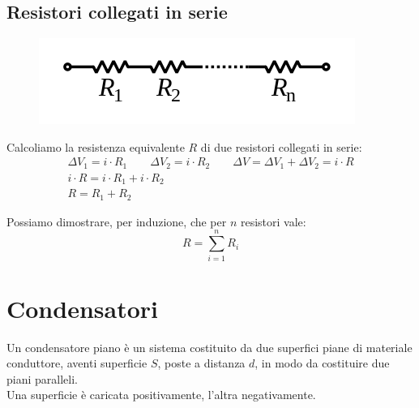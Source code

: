 \subsection{Resistori collegati in serie}
\begin{figure}[h!]
	\centering
    \includegraphics[scale=0.5]{Pictures/resistori-serie}
\end{figure}
Calcoliamo la resistenza equivalente $R$ di due resistori collegati in serie:
\begin{displaymath}\begin{aligned}
	\Delta V_1 = i \cdot R_1 \qquad \Delta V_2 = i \cdot R_2 \qquad \Delta V = \Delta V_1 + \Delta V_2 = i \cdot R \\ 
    i \cdot R = i \cdot R_1 + i\cdot R_2\\
    R = R_1 + R_2
\end{aligned}\end{displaymath}

Possiamo dimostrare, per induzione, che per $n$ resistori vale:
\begin{displaymath}
	R = \sum_{i=1}^n R_i
\end{displaymath}

\section{Condensatori}
Un condensatore piano è un sistema costituito da due superfici piane di materiale conduttore, aventi superficie $S$, poste a distanza $d$, in modo da costituire due piani paralleli.\\
Una superficie è caricata positivamente, l'altra negativamente.

